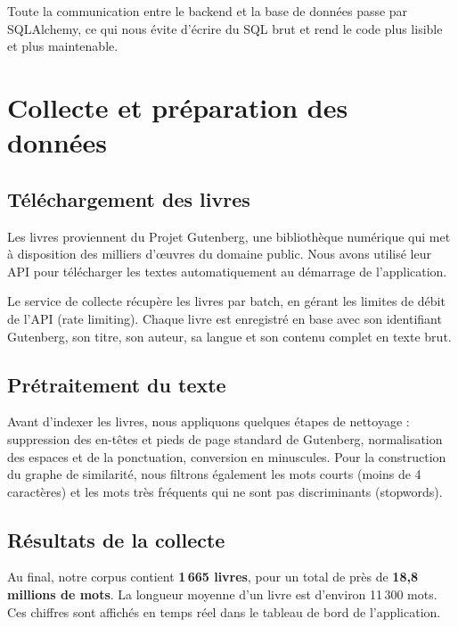 \documentclass[12pt,a4paper]{article}
\begin{document}
Toute la communication entre le backend et la base de données passe par
SQLAlchemy, ce qui nous évite d'écrire du SQL brut et rend le code plus
lisible et plus maintenable.

\section{Collecte et préparation des données}

\subsection{Téléchargement des livres}

Les livres proviennent du Projet Gutenberg, une bibliothèque numérique qui
met à disposition des milliers d'œuvres du domaine public. Nous avons utilisé
leur API pour télécharger les textes automatiquement au démarrage de l'application.

Le service de collecte récupère les livres par batch, en gérant les limites
de débit de l'API (rate limiting). Chaque livre est enregistré en base avec
son identifiant Gutenberg, son titre, son auteur, sa langue et son contenu
complet en texte brut.

\subsection{Prétraitement du texte}

Avant d'indexer les livres, nous appliquons quelques étapes de nettoyage :
suppression des en-têtes et pieds de page standard de Gutenberg,
normalisation des espaces et de la ponctuation, conversion en minuscules.
Pour la construction du graphe de similarité, nous filtrons également les
mots courts (moins de 4 caractères) et les mots très fréquents qui ne sont
pas discriminants (stopwords).

\subsection{Résultats de la collecte}

Au final, notre corpus contient \textbf{1\,665 livres}, pour un total de
près de \textbf{18,8 millions de mots}. La longueur moyenne d'un livre est
d'environ 11\,300 mots. Ces chiffres sont affichés en temps réel dans le
tableau de bord de l'application.
\end{document}
